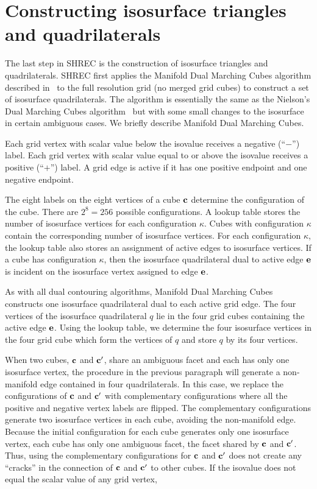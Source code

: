 \section{Constructing isosurface triangles and quadrilaterals}
\label{section:isoPoly}

The last step in SHREC is the construction of isosurface triangles
and quadrilaterals.
SHREC first applies the Manifold Dual Marching Cubes algorithm
described in~\cite{Wenger:2013:Isosurfaces}
to the full resolution grid (no merged grid cubes)
to construct a set of isosurface quadrilaterals.
The algorithm is essentially the same 
as the Nielson's Dual Marching Cubes algorithm~\cite{n-dmc-04}
but with some small changes to the isosurface
in certain ambiguous cases.
We briefly describe Manifold Dual Marching Cubes.

Each grid vertex with scalar value below the isovalue 
receives a negative (``$-$'') label.
Each grid vertex with scalar value equal to or above the isovalue 
receives a positive (``$+$'') label.
A grid edge is active if
it has one positive endpoint and one negative endpoint.

The eight labels on the eight vertices of a cube $\mathbf{c}$
determine the configuration of the cube.
There are $2^8 = 256$ possible configurations.
A lookup table stores the number of isosurface vertices 
for each configuration $\kappa$.
Cubes with configuration $\kappa$ 
contain the corresponding number of isosurface vertices.
For each configuration $\kappa$,
the lookup table also stores an assignment of active edges
to isosurface vertices.
If a cube has configuration $\kappa$,
then the isosurface quadrilateral dual to active edge $\mathbf{e}$
is incident on the isosurface vertex assigned to edge $\mathbf{e}$.

As with all dual contouring algorithms,
Manifold Dual Marching Cubes constructs one isosurface quadrilateral
dual to each active grid edge.
The four vertices of the isosurface quadrilateral $q$
lie in the four grid cubes containing the active edge $\mathbf{e}$.
Using the lookup table, we determine the four isosurface vertices
in the four grid cube which form the vertices of $q$
and store $q$ by its four vertices.

When two cubes, $\mathbf{c}$ and $\mathbf{c}'$, 
share an ambiguous facet and each has only one
isosurface vertex, the procedure in the previous paragraph
will generate a non-manifold edge contained in four quadrilaterals.
In this case, we replace the configurations of $\mathbf{c}$ and $\mathbf{c}'$
with complementary configurations where all the positive and negative
vertex labels are flipped.
The complementary configurations generate two isosurface vertices
in each cube, avoiding the non-manifold edge.
Because the initial configuration for each cube
generates only one isosurface vertex,
each cube has only one ambiguous facet,
the facet shared by $\mathbf{c}$ and $\mathbf{c}'$.
Thus, using the complementary configurations for $\mathbf{c}$ and $\mathbf{c}'$
does not create any ``cracks'' in the connection of $\mathbf{c}$ and $\mathbf{c}'$
to other cubes.
If the isovalue does not equal the scalar value of any grid vertex,


